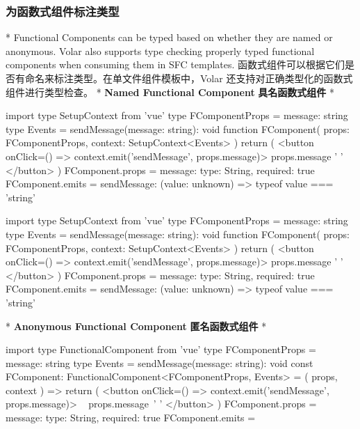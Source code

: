 \begin{paracol}{2}
\subsubsection{为函数式组件标注类型}
\switchcolumn[0]*%
Functional Components can be typed based on whether they are named or
anonymous. Volar also supports type checking properly typed functional
components when consuming them in SFC templates.
\switchcolumn
函数式组件可以根据它们是否有命名来标注类型。在单文件组件模板中，Volar
还支持对正确类型化的函数式组件进行类型检查。
\switchcolumn[0]*%
\textbf{Named Functional Component}
\switchcolumn
\textbf{具名函数式组件}
\switchcolumn[0]*%
\begin{codeHtml}
import type { SetupContext } from 'vue'
type FComponentProps = {
  message: string
}
type Events = {
  sendMessage(message: string): void
}
function FComponent(
  props: FComponentProps,
  context: SetupContext<Events>
) {
  return (
    <button onClick={() => context.emit('sendMessage', props.message)}>
        {props.message} {' '}
    </button>
  )
}
FComponent.props = {
  message: {
    type: String,
    required: true
  }
}
FComponent.emits = {
  sendMessage: (value: unknown) => typeof value === 'string'
}
\end{codeHtml}
\switchcolumn
\begin{codeHtml}
import type { SetupContext } from 'vue'
type FComponentProps = {
  message: string
}
type Events = {
  sendMessage(message: string): void
}
function FComponent(
  props: FComponentProps,
  context: SetupContext<Events>
) {
  return (
    <button onClick={() => context.emit('sendMessage', props.message)}>
        {props.message} {' '}
    </button>
  )
}
FComponent.props = {
  message: {
    type: String,
    required: true
  }
}
FComponent.emits = {
  sendMessage: (value: unknown) => typeof value === 'string'
}
\end{codeHtml}
\switchcolumn[0]*%
\textbf{Anonymous Functional Component}
\switchcolumn
\textbf{匿名函数式组件}
\switchcolumn[0]*%
\begin{codeHtml}
import type { FunctionalComponent } from 'vue'
type FComponentProps = {
  message: string
}
type Events = {
  sendMessage(message: string): void
}
const FComponent: FunctionalComponent<FComponentProps, Events> = (
  props,
  context
) => {
  return (
    <button onClick={() => context.emit('sendMessage', props.message)}>
        {props.message} {' '}
    </button>
  )
}
FComponent.props = {
  message: {
    type: String,
    required: true
  }
}
FComponent.emits = {
}
\end{codeHtml}
\end{paracol}
